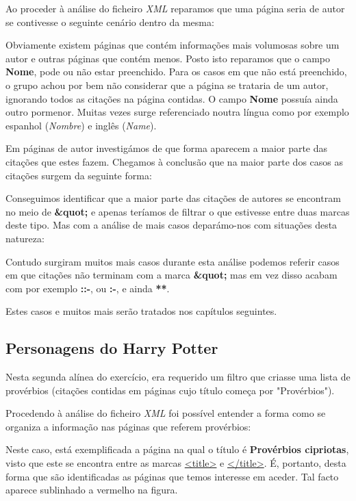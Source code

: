 \documentclass[11pt,a4paper]{report}
\begin{document}
Ao proceder à análise do ficheiro \emph{XML} reparamos que uma página seria de autor se contivesse o seguinte cenário dentro da mesma:


Obviamente existem páginas que contém informações mais volumosas sobre um autor e outras páginas que contém menos. Posto isto reparamos que o campo \textbf{Nome}, pode ou não estar preenchido. Para os casos em que não está preenchido, o grupo achou por bem não considerar que a página se trataria de um autor, ignorando todos as citações na página contidas. O campo \textbf{Nome} possuía ainda outro pormenor. Muitas vezes surge referenciado noutra língua como por exemplo espanhol (\emph{Nombre}) e inglês (\emph{Name}).

Em páginas de autor investigámos de que forma aparecem a maior parte das citações que estes fazem. Chegamos à conclusão que na maior parte dos casos as citações surgem da seguinte forma:

Conseguimos identificar que a maior parte das citações de autores se encontram no meio de \textbf{\&quot;} e apenas teríamos de filtrar o que estivesse entre duas marcas deste tipo. Mas com a análise de mais casos deparámo-nos com situações desta natureza:


Contudo surgiram muitos mais casos durante esta análise podemos referir casos em que citações não terminam com a marca \textbf{\&quot;} mas em vez disso acabam com por exemplo \textbf{::-}, ou \textbf{:-}, e ainda \textbf{**}.

Estes casos e muitos mais serão tratados nos capítulos seguintes.


\newpage

\subsection{Personagens do Harry Potter}
\label{subsec:analise2}

Nesta segunda alínea do exercício, era requerido um filtro que criasse uma lista de provérbios (citações contidas em páginas cujo título começa por "Provérbios").

Procedendo à análise do ficheiro \textit{XML} foi possível entender a forma como se organiza a informação nas páginas que referem provérbios:


Neste caso, está exemplificada a página na qual o título é \textbf{Provérbios cipriotas}, visto que este se encontra entre as marcas \underline{<title>} e \underline{</title>}. É, portanto, desta forma que são identificadas as páginas que temos interesse em aceder. Tal facto aparece sublinhado a vermelho na figura.
\end{document}
